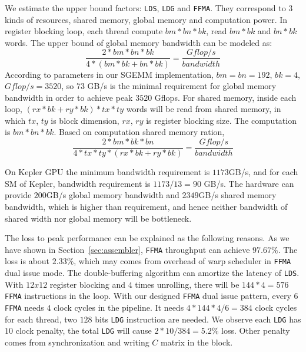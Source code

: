 We estimate the upper bound factors: {\tt LDS}, {\tt LDG} and {\tt FFMA}. They correspond to $3$ kinds of resources, 
shared
memory, global memory and computation power. In register blocking loop, each thread compute $bm*bn*bk$, read $bm*bk$
and $bn*bk$ words. The upper bound of global memory bandwidth can be modeled as:
\begin{displaymath}
    \frac{2*bm*bn*bk}{4*(bm*bk + bn*bk)} = \frac{Gflop/s}{bandwidth}
\end{displaymath}
According to parameters in our SGEMM implementation, $bm=bn=192$, $bk=4$, $Gflop/s=3520$, so $73$ GB/s is the minimal
requirement for global memory bandwidth in order to achieve peak $3520$ Gflops.
For shared memory, inside each loop, $(rx*bk + ry * bk)*tx*ty$ words will be read from shared memory, in which $tx$,
$ty$ is block dimension, $rx$, $ry$ is register blocking size. The computation is $bm*bn*bk$. Based on computation
shared memory ration,
\begin{displaymath}
    \frac{2*bm*bk*bn}{4*tx*ty*(rx*bk + ry *bk)}  = \frac{Gflop/s}{bandwidth}
\end{displaymath}

On Kepler GPU the minimum bandwidth requirement is $1173$GB/s, and for each SM of Kepler, bandwidth requirement is
$1173/13=90$ GB/s.
The hardware can provide $200$GB/s global memory bandwidth and $2349$GB/s shared memory bandwidth, which is
higher than requirement, and hence neither bandwidth of shared width nor global memory will be bottleneck.

The loss to peak performance can be explained as the following reasons. As we have shown in 
Section~\ref{sec:assembler}, {\tt FFMA} throughput can achieve $97.67\%$. The loss is about $2.33\%$, which may comes 
from overhead of warp scheduler in {\tt FFMA} dual issue mode. The double-buffering algorithm can amortize the latency 
of {\tt LDS}.
With $12x12$ register blocking and $4$ times unrolling, there will be $144*4=576$ {\tt FFMA} instructions in the loop.
With our designed {\tt FFMA} dual issue pattern, every $6$ {\tt FFMA} needs $4$ clock cycles in the pipeline.
It needs $4*144*4/6=384$ clock cycles for each thread,  two $128$ bits {\tt LDG} instruction are needed.
We observe each {\tt LDG} has $10$ clock penalty, the total {\tt LDG} will cause $2*10/384 = 5.2\%$ loss. Other penalty 
comes from synchronization and writing $C$ matrix in the block.
